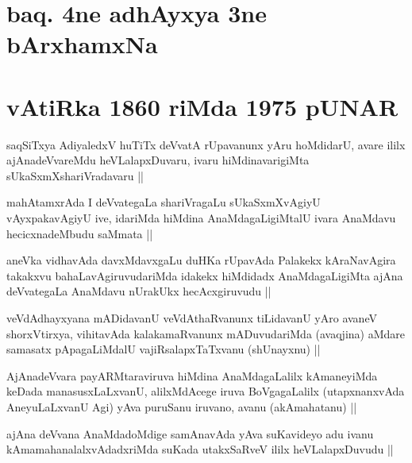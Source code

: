 
\section*{baq. 4ne adhAyxya 3ne bArxhamxNa}

\section*{vAtiRka 1860 riMda 1975 pUNAR}


\begin{artha}
saqSiTxya AdiyaledxV huTiTx deVvatA rUpavanunx yAru hoMdidarU, avare
ililx ajAnadeVvareMdu heVLalapxDuvaru, ivaru hiMdinavarigiMta
sUkaSxmXshariVradavaru ||
\end{artha}


\begin{artha}
mahAtamxrAda I deVvategaLa shariVragaLu sUkaSxmXvAgiyU vAyxpakavAgiyU
ive, idariMda hiMdina AnaMdagaLigiMtalU ivara AnaMdavu hecicxnadeMbudu
saMmata ||
\end{artha}

\begin{artha}
aneVka vidhavAda davxMdavxgaLu duHKa rUpavAda Palakekx kAraNavAgira
takakxvu bahaLavAgiruvudariMda idakekx hiMdidadx AnaMdagaLigiMta ajAna
deVvategaLa AnaMdavu nUrakUkx hecAcxgiruvudu ||
\end{artha}


\begin{artha}
veVdAdhayxyana mADidavanU veVdAthaRvanunx tiLidavanU yAro avaneV
shorxVtirxya, vihitavAda kalakamaRvanunx mADuvudariMda (avaqjina)
aMdare samasatx pApagaLiMdalU vajiRsalapxTaTxvanu (shUnayxnu) ||
\end{artha}


\begin{artha}
AjAnadeVvara payARMtaraviruva hiMdina AnaMdagaLalilx kAmaneyiMda
keDada manasusxLaLxvanU, alilxMdAcege iruva BoVgagaLalilx
(utapxnanxvAda AneyuLaLxvanU Agi) yAva puruSanu iruvano, avanu
(akAmahatanu) ||
\end{artha}

\begin{artha}
ajAna deVvana AnaMdadoMdige samAnavAda yAva suKavideyo adu ivanu
kAmamahanalalxvAdadxriMda suKada utakxSaRveV ililx heVLalapxDuvudu ||
\end{artha}

